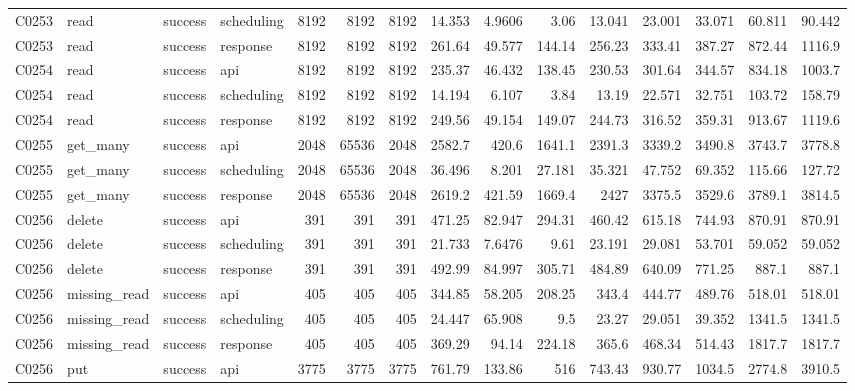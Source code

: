 \begin{landscape}
\begin{longtable}{llllrrrrrrrrrrr}
C0253 & read & success & scheduling & 8192 & 8192 & 8192 & 14.353 & 4.9606 & 3.06 & 13.041 & 23.001 & 33.071 & 60.811 & 90.442\\
C0253 & read & success & response & 8192 & 8192 & 8192 & 261.64 & 49.577 & 144.14 & 256.23 & 333.41 & 387.27 & 872.44 & 1116.9\\
C0254 & read & success & api & 8192 & 8192 & 8192 & 235.37 & 46.432 & 138.45 & 230.53 & 301.64 & 344.57 & 834.18 & 1003.7\\
C0254 & read & success & scheduling & 8192 & 8192 & 8192 & 14.194 & 6.107 & 3.84 & 13.19 & 22.571 & 32.751 & 103.72 & 158.79\\
C0254 & read & success & response & 8192 & 8192 & 8192 & 249.56 & 49.154 & 149.07 & 244.73 & 316.52 & 359.31 & 913.67 & 1119.6\\
C0255 & get\_\allowbreak{}many & success & api & 2048 & 65536 & 2048 & 2582.7 & 420.6 & 1641.1 & 2391.3 & 3339.2 & 3490.8 & 3743.7 & 3778.8\\
C0255 & get\_\allowbreak{}many & success & scheduling & 2048 & 65536 & 2048 & 36.496 & 8.201 & 27.181 & 35.321 & 47.752 & 69.352 & 115.66 & 127.72\\
C0255 & get\_\allowbreak{}many & success & response & 2048 & 65536 & 2048 & 2619.2 & 421.59 & 1669.4 & 2427 & 3375.5 & 3529.6 & 3789.1 & 3814.5\\
C0256 & delete & success & api & 391 & 391 & 391 & 471.25 & 82.947 & 294.31 & 460.42 & 615.18 & 744.93 & 870.91 & 870.91\\
C0256 & delete & success & scheduling & 391 & 391 & 391 & 21.733 & 7.6476 & 9.61 & 23.191 & 29.081 & 53.701 & 59.052 & 59.052\\
C0256 & delete & success & response & 391 & 391 & 391 & 492.99 & 84.997 & 305.71 & 484.89 & 640.09 & 771.25 & 887.1 & 887.1\\
C0256 & missing\_\allowbreak{}read & success & api & 405 & 405 & 405 & 344.85 & 58.205 & 208.25 & 343.4 & 444.77 & 489.76 & 518.01 & 518.01\\
C0256 & missing\_\allowbreak{}read & success & scheduling & 405 & 405 & 405 & 24.447 & 65.908 & 9.5 & 23.27 & 29.051 & 39.352 & 1341.5 & 1341.5\\
C0256 & missing\_\allowbreak{}read & success & response & 405 & 405 & 405 & 369.29 & 94.14 & 224.18 & 365.6 & 468.34 & 514.43 & 1817.7 & 1817.7\\
C0256 & put & success & api & 3775 & 3775 & 3775 & 761.79 & 133.86 & 516 & 743.43 & 930.77 & 1034.5 & 2774.8 & 3910.5\\

\end{longtable}
\end{landscape}

